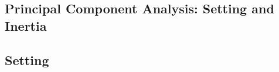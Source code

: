 \begin{notechapter}
\forgetcs\mypoint\newcommand{\mypoint}[2]{\tikz[remember picture]{\node[inner sep=0, anchor=base](#1){$#2$};}}
\forgetcs\framedtext\newcommand{\framedtext}[1]{%
\par%
\noindent\fbox{%
    \parbox{\dimexpr\linewidth-2\fboxsep-2\fboxrule}{#1}%
}%
}
\forgetcs\horzbar\newcommand*{\horzbar}{\rule[.5ex]{5.5ex}{0.5pt}}
\forgetcs\vertbar\newcommand*{\vertbar}{\rule[-1ex]{0.5pt}{5.5ex}}
\guardnewlength{\Lnote}
\forgetcs\notte\newcommand{\notte}[1]
     {\addtolength{\leftmargini}{4em}
        \settowidth{\Lnote}{\textbf{Note:~}}
        \begin{quote}
            \rule{\dimexpr\textwidth-2\leftmargini}{1pt}\\
                        \mbox{}\hspace{-\Lnote}\textbf{Note:~}%
                                            #1\\[-0.5ex] 
            \rule{\dimexpr\textwidth-2\leftmargini}{1pt}
        \end{quote}
        \addtolength{\leftmargini}{-4em}}
\forgetcs\Tr\newcommand{\Tr}{\operatorname{Tr}}
\chapter{Principal Component Analysis: Setting and Inertia}\label{ch:pca-overview}

\section{Setting}


\end{notechapter}
